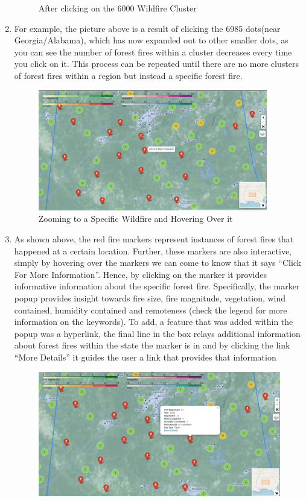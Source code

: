 \documentclass[fontsize=11pt]{article}
\begin{document}
\begin{enumerate}
\begin{figure}[h]
            \caption{After clicking on the 6000 Wildfire Cluster}
            \label{fig:my_label}
        \end{figure}
\newpage
    \item For example, the picture above is a result of clicking the 6985 dots(near Georgia/Alabama), which has now expanded out to other smaller dots, as you can see the number of forest fires within a cluster decreases every time you click on it. This process can be repeated until there are no more clusters of forest fires within a region but instead a specific forest fire.\\
    \begin{figure}[h]
            \centering
            \includegraphics[width = 10cm ]{zoom2.png}
            \caption{Zooming to a Specific Wildfire and Hovering Over it}
            \label{fig:my_label}
        \end{figure}
    \item As shown above, the red fire markers represent instances of forest fires that happened at a certain location. Further, these markers are also interactive, simply by hovering over the markers we can come to know that it says “Click For More Information”. Hence, by clicking on the marker it provides informative information about the specific forest fire. Specifically, the marker popup provides insight towards fire size, fire magnitude, vegetation, wind contained, humidity contained and remoteness (check the legend for more information on the keywords). To add, a feature that was added within the popup was a hyperlink, the final line in the box relays additional information about forest fires within the state the marker is in and by clicking the link “More Details” it guides the user a link that provides that information \\
    \begin{figure}[h]
            \centering
            \includegraphics[width = 15cm ]{zoom3.png}

\end{figure}
\end{enumerate}
\end{document}
